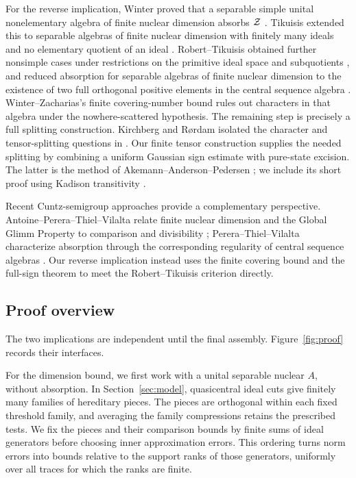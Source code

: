 For the reverse implication, Winter proved that a separable simple
unital nonelementary algebra of finite nuclear dimension absorbs $\mathcal Z$
\cite[Corollary~6.3]{WinterAbsorption}. Tikuisis extended this to
separable algebras of finite nuclear dimension with finitely many ideals
and no elementary quotient of an ideal
\cite[Corollary~8.7]{TikuisisFiniteIdeals}. Robert--Tikuisis obtained
further nonsimple cases under restrictions on the primitive ideal space
and subquotients \cite[Corollaries~7.11 and~7.16]{RT}, and reduced absorption
for separable algebras of finite nuclear dimension to the existence of
two full orthogonal positive elements in the central sequence algebra
\cite[Theorem~1.2]{RT}. Winter--Zacharias's finite covering-number bound
\cite[Proposition~4.3]{WZNuclear} rules out characters in that algebra
under the nowhere-scattered hypothesis. The remaining step is precisely
a full splitting construction. Kirchberg and R\o rdam isolated the
character and tensor-splitting questions in \cite{KR}. Our finite tensor
construction supplies the needed splitting by combining a uniform
Gaussian sign estimate with pure-state excision. The latter is the
method of Akemann--Anderson--Pedersen \cite{AAP}; we include its short
proof using Kadison transitivity \cite{Kadison}.

Recent Cuntz-semigroup approaches provide a complementary perspective.
Antoine--Perera--Thiel--Vilalta relate finite nuclear dimension and the
Global Glimm Property to comparison and divisibility
\cite[Theorem~6.5]{APTV}; Perera--Thiel--Vilalta characterize absorption
through the corresponding regularity of central sequence algebras
\cite[Theorem~3.6]{PTV}. Our reverse implication instead uses the
finite covering bound and the full-sign theorem to meet the
Robert--Tikuisis criterion directly.

\subsection{Proof overview}

The two implications are independent until the final assembly. Figure~\ref{fig:proof}
records their interfaces.

For the dimension bound, we first work with a unital separable nuclear
$A$, without absorption. In Section~\ref{sec:model}, quasicentral ideal
cuts give finitely many families of hereditary pieces. The pieces are
orthogonal within each fixed threshold family, and averaging the
family compressions retains the prescribed tests. We fix the pieces
and their comparison bounds by finite sums of ideal generators before
choosing inner approximation errors. This ordering turns norm errors into
bounds relative to the support ranks of those generators, uniformly
over all traces for which the ranks are finite.

